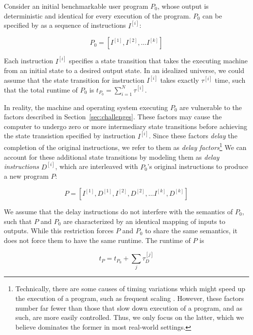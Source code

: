 \documentclass[conference]{IEEEtran}
\begin{document}
Consider an initial benchmarkable user program $P_0$, whose output is deterministic and
identical for every execution of the program. $P_0$ can be specified by as a sequence of
instructions $I^{[i]}$:

\begin{equation}
    P_0 = \left[I^{[1]}, I^{[2]}, \dots I^{[k]}\right]
\end{equation}

Each instruction $I^{[i]}$ specifies a state transition that takes the executing machine
from an initial state to a desired output state. In an idealized universe, we could assume
that the state transition for instruction $I^{[i]}$ takes exactly $\tau^{[i]}$ time, such
that the total runtime of $P_0$ is $t_{P_0} = \sum_{i=1}^N \tau^{[i]}$.

In reality, the machine and operating system executing $P_0$ are vulnerable to the factors
described in Section~\ref{sec:challenges}. These factors may cause the computer to undergo
zero or more intermediary state transitions before achieving the state transistion specified
by instruction $I^{[i]}$. Since these factors \textit{delay} the completion of the original
instructions, we refer to them as \textit{delay factors}\footnote{Technically, there are
some causes of timing variations which might speed up the execution of a program, such as
frequent scaling . However, these factors number far fewer than those that slow
down execution of a program, and as such, are more easily controlled. Thus, we only focus on
the latter, which we believe dominates the former in most real-world settings.} We can
account for these additional state transitions by modeling them as
\textit{delay instructions} $D^{[i]}$, which are interleaved with $P_0$'s original
instructions to produce a new program $P$:

\begin{equation}
    P = \left[I^{[1]}, D^{[1]}, I^{[2]}, D^{[2]}, \dots I^{[k]}, D^{[k]}\right]
\end{equation}

We assume that the delay instructions do not interfere with the semantics of $P_0$, such
that $P$ and $P_0$ are characterized by an identical mapping of inputs to outputs. While
this restriction forces $P$ and $P_0$ to share the same semantics, it does not force them
to have the same runtime. The runtime of $P$ is

\begin{equation}
    t_P = t_{P_0} + \sum_{j} \tau^{[j]}_D
\end{equation}
\end{document}
